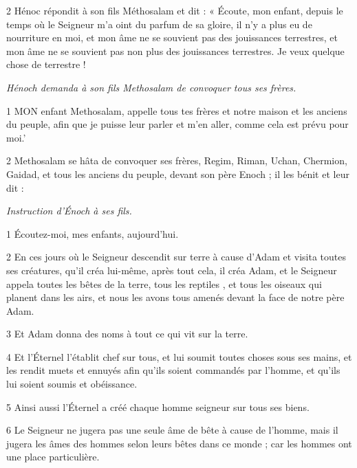 \par 2 Hénoc répondit à son fils Méthosalam et dit : « Écoute, mon enfant, depuis le temps où le Seigneur m'a oint du parfum de sa gloire, il n'y a plus eu de nourriture en moi, et mon âme ne se souvient pas des jouissances terrestres, et mon âme ne se souvient pas non plus des jouissances terrestres. Je veux quelque chose de terrestre !


\par \textit{Hénoch demanda à son fils Methosalam de convoquer tous ses frères.}

\par 1 MON enfant Methosalam, appelle tous tes frères et notre maison et les anciens du peuple, afin que je puisse leur parler et m'en aller, comme cela est prévu pour moi.'

\par 2 Methosalam se hâta de convoquer ses frères, Regim, Riman, Uchan, Chermion, Gaidad, et tous les anciens du peuple, devant son père Enoch ; il les bénit et leur dit :


\par \textit{Instruction d'Énoch à ses fils.}

\par 1 Écoutez-moi, mes enfants, aujourd'hui.

\par 2 En ces jours où le Seigneur descendit sur terre à cause d'Adam et visita toutes ses créatures, qu'il créa lui-même, après tout cela, il créa Adam, et le Seigneur appela toutes les bêtes de la terre, tous les reptiles , et tous les oiseaux qui planent dans les airs, et nous les avons tous amenés devant la face de notre père Adam.

\par 3 Et Adam donna des noms à tout ce qui vit sur la terre.

\par 4 Et l'Éternel l'établit chef sur tous, et lui soumit toutes choses sous ses mains, et les rendit muets et ennuyés afin qu'ils soient commandés par l'homme, et qu'ils lui soient soumis et obéissance.

\par 5 Ainsi aussi l'Éternel a créé chaque homme seigneur sur tous ses biens.

\par 6 Le Seigneur ne jugera pas une seule âme de bête à cause de l'homme, mais il jugera les âmes des hommes selon leurs bêtes dans ce monde ; car les hommes ont une place particulière.

